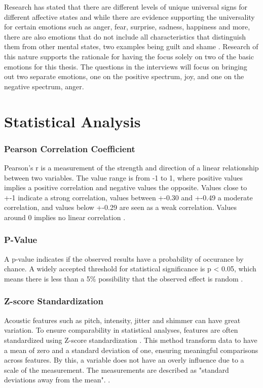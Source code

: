 Research has stated that there are different levels of unique universal signs for different affective states and while there are evidence supporting the universality for certain emotions such as anger, fear, surprise, sadness, happiness and more, there are also emotions that do not include all characteristics that distinguish them from other mental states, two examples being guilt and shame \autocite{Ekman2011}. Research of this nature supports the rationale for having the focus solely on two of the basic emotions for this thesis. The questions in the interviews will focus on bringing out two separate emotions, one on the positive spectrum, joy, and one on the negative spectrum, anger.



\section{Statistical Analysis}
\label{sec:theo-stat-analyse}

\subsubsection{Pearson Correlation Coefficient}
Pearson's r is a measurement of the strength and direction of a linear relationship between two variables. The value range is from -1 to 1, where positive values implies a positive correlation and negative values the opposite.
Values close to +-1 indicate a strong correlation, values between +-0.30 and +-0.49 a moderate correlation, and values 
below +-0.29 are seen as a weak correlation. Values around 0 implies no linear correlation \autocite{Bruce2017}.

\subsubsection{P-Value}
A p-value indicates if the observed results have a probability of occurance by chance. A widely accepted threshold for statistical significance 
is p < 0.05, which means there is less than a 5\% possibility that the observed effect is random \autocite{Bruce2017}. 

\subsubsection{Z-score Standardization}
Acoustic features such as pitch, intensity, jitter and shimmer can have great variation. To ensure comparability in statistical analyses, features are often standardized using Z-score standardization \autocite{Ekberg2023}.
This method transform data to have a mean of zero and a standard deviation of one, ensuring meaningful comparisons across features. By this, a variable does not have an overly influence due to a scale of the measurement. 
The measurements are described as "standard deviations away from the mean". \autocite{Bruce2017}. 

